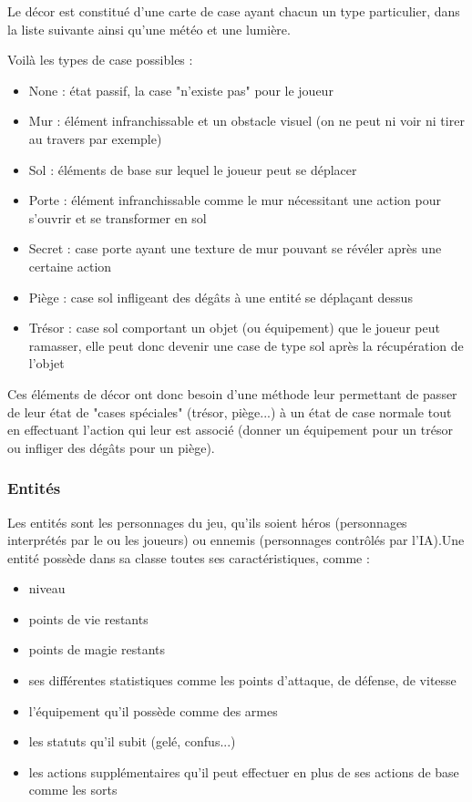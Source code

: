 \documentclass[a4paper,12pt]{article}
\begin{document}
Le décor est constitué d'une carte de case ayant chacun un type particulier, dans la liste suivante ainsi qu'une météo et une lumière.

Voilà les types de case possibles :
\begin{itemize}
    \item None : état passif, la case "n'existe pas" pour le joueur
    \item Mur : élément infranchissable et un obstacle visuel (on ne peut ni voir ni tirer au travers par exemple)
    \item Sol : éléments de base sur lequel le joueur peut se déplacer
    \item Porte : élément infranchissable comme le mur nécessitant une action pour s'ouvrir et se transformer en sol
    \item Secret : case porte ayant une texture de mur pouvant se révéler après une certaine action
    \item Piège : case sol infligeant des dégâts à une entité se déplaçant dessus
    \item Trésor : case sol comportant un objet (ou équipement) que le joueur peut ramasser, elle peut donc devenir une case de type sol après la récupération de l'objet
\end{itemize}

Ces éléments de décor ont donc besoin d'une méthode leur permettant de passer de leur état de "cases spéciales" (trésor, piège...) à un état de case normale tout en effectuant l'action qui leur est associé (donner un équipement pour un trésor ou infliger des dégâts pour un piège).


\subsubsection{Entités}
Les entités sont les personnages du jeu, qu'ils soient héros (personnages interprétés par le ou les joueurs) ou ennemis (personnages contrôlés par l'IA).Une entité possède dans sa classe toutes ses caractéristiques, comme :
\begin{itemize}
    \item niveau
    \item points de vie restants
    \item points de magie restants
    \item ses différentes statistiques comme les points d'attaque, de défense, de vitesse
    \item l'équipement qu'il possède comme des armes
    \item les statuts qu'il subit (gelé, confus...)
    \item les actions supplémentaires qu'il peut effectuer en plus de ses actions de base comme les sorts
\end{itemize}
\end{document}
